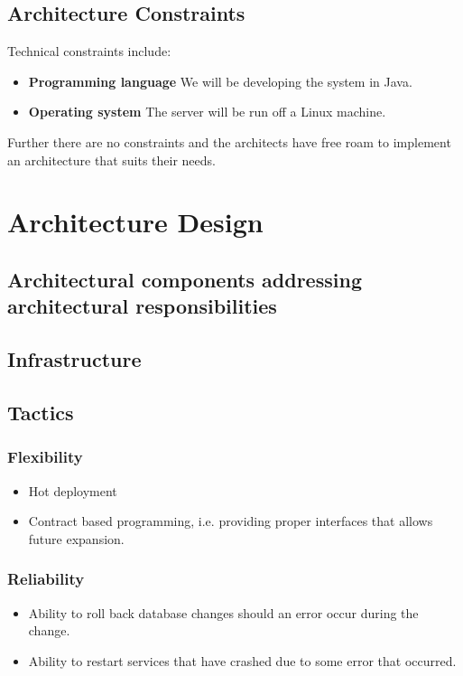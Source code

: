 \documentclass[hidelinks,english]{article}
\begin{document}
		\subsection{Architecture Constraints}
			Technical constraints include:
			\begin{itemize}
				\item \textbf{Programming language} We will be developing the system in Java.
				\item \textbf{Operating system} The server will be run off a Linux machine. 
			\end{itemize}
			Further there are no constraints and the architects have free roam to implement an architecture that suits their needs.
			
	\section{Architecture Design}
	
		\subsection{Architectural components addressing architectural responsibilities}
		
		\subsection{Infrastructure}
		
		\subsection{Tactics}
			\subsubsection{Flexibility}
				\begin{itemize}
					\item Hot deployment
					\item Contract based programming, i.e. providing proper interfaces that allows future expansion.
				\end{itemize}
			
			\subsubsection{Reliability}
				\begin{itemize}
					\item Ability to roll back database changes should an error occur during the change.
					\item Ability to restart services that have crashed due to some error that occurred.
				\end{itemize}
							
\end{document}
